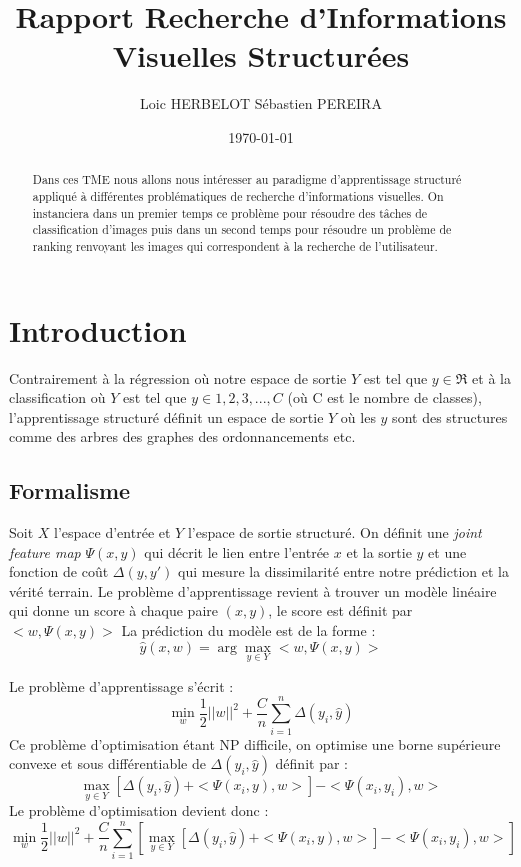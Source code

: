 \documentclass[a4paper]{article}
\title{Rapport Recherche d'Informations Visuelles Structurées }
\author{Loic HERBELOT Sébastien PEREIRA}
\date{\today}
\begin{document}
\maketitle

\begin{abstract}
Dans ces TME nous allons nous intéresser au paradigme d'apprentissage structuré appliqué à différentes problématiques de recherche d'informations visuelles. On instanciera dans un premier temps ce problème pour résoudre des tâches de classification d'images puis dans un second temps pour résoudre un problème de ranking renvoyant les images qui correspondent à la recherche de l'utilisateur.
\end{abstract}

\section{Introduction}
Contrairement à la régression où notre espace de sortie $Y$ est tel que $y \in \Re $   et à la classification où $Y$ est tel que $y \in {1, 2, 3, ..., C}$ (où C est le nombre de classes), l'apprentissage structuré définit un espace de sortie $Y$ où les $y$ sont des structures comme des arbres des graphes des ordonnancements etc.
\subsection{Formalisme}
Soit $X$ l'espace d'entrée et $Y$ l'espace de sortie structuré.
On définit une \textit{joint feature map} $\Psi(x,y)$ qui décrit le lien entre l'entrée $x$ et la sortie $y$ et une fonction de coût $\Delta(y,y')$ qui mesure la dissimilarité entre notre prédiction et la vérité terrain.
Le problème d'apprentissage revient à trouver un modèle linéaire qui donne un score à chaque paire $(x,y)$, le score est définit par $<w, \Psi(x,y)>$
La prédiction du modèle est de la forme :
\begin{equation}
\hat{y}(x,w) = \arg\max_{y \in Y} <w, \Psi(x,y)>
\end{equation}

Le problème d'apprentissage s'écrit :
\begin{equation}
\min_{w} \frac{1}{2} {||w||}^2 + \frac{C}{n} \sum\limits_{i=1}^n \Delta(y_i, \hat{y})
\end{equation}
Ce problème d'optimisation étant NP difficile, on optimise une borne supérieure convexe et sous différentiable de $\Delta(y_i, \hat{y})$ définit par :
\begin{equation}
\max_{y \in Y} [\Delta(y_i, \hat{y}) + <\Psi(x_i,y),w>]  - <\Psi(x_i,y_i),w>
\end{equation}
Le problème d'optimisation devient donc :
\begin{equation}
\min_{w} \frac{1}{2} {||w||}^2 + \frac{C}{n} \sum\limits_{i=1}^n [ \max_{y \in Y} [\Delta(y_i, \hat{y}) + <\Psi(x_i,y),w>]  - <\Psi(x_i,y_i),w>]
\end{equation}
\end{document}
